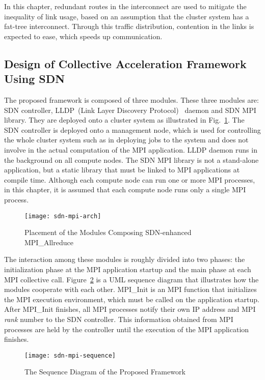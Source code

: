 In this chapter, redundant routes in the interconnect are used to mitigate the
inequality of link usage, based on an assumption that the cluster system has a
fat-tree interconnect. Through this traffic distribution, contention in the
links is expected to ease, which speeds up communication.

\subsection{Design of Collective Acceleration Framework Using SDN}

The proposed framework is composed of three modules. These three modules are:
SDN controller, LLDP~(Link Layer Discovery Protocol)~\autocite{lldp}
daemon and SDN MPI library. They are deployed onto a
cluster system as illustrated in Fig.~\ref{fig:proposal-placement}. The SDN
controller is deployed onto a management node, which is used for
controlling the whole cluster system such as in deploying jobs to the system
and does not involve in the actual computation of the MPI application. LLDP
daemon runs in the background on all compute nodes. The SDN MPI library is not
a stand-alone application, but a static library that must be linked to MPI
applications at compile time. Although each compute node can run one or more
MPI processes, in this chapter, it is assumed that each compute node runs only
a single MPI process.

\begin{figure}
    \centering
    \texttt{[image: sdn-mpi-arch]}
    \caption{Placement of the Modules Composing SDN-enhanced MPI\_Allreduce}%
    \label{fig:proposal-placement}
\end{figure}

The interaction among these modules is roughly divided into two phases: the
initialization phase at the MPI application startup and the main phase at each
MPI collective call. Figure~\ref{fig:proposal-sequence} is a UML sequence
diagram that illustrates how the modules cooperate with each other. MPI\_Init
is an MPI function that initializes the MPI execution environment, which must
be called on the application startup. After MPI\_Init finishes, all MPI
processes notify their own IP address and MPI \emph{rank} number to the SDN
controller. This information obtained from MPI processes are held by the
controller until the execution of the MPI application finishes.

\begin{figure}
    \centering
    \texttt{[image: sdn-mpi-sequence]}
    \caption{The Sequence Diagram of the Proposed Framework}%
    \label{fig:proposal-sequence}
\end{figure}

